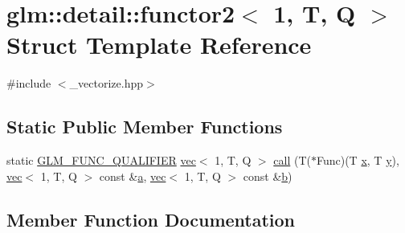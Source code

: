 \hypertarget{structglm_1_1detail_1_1functor2_3_011_00_01_t_00_01_q_01_4}{}\section{glm\+:\+:detail\+:\+:functor2$<$ 1, T, Q $>$ Struct Template Reference}
\label{structglm_1_1detail_1_1functor2_3_011_00_01_t_00_01_q_01_4}


{\ttfamily \#include $<$\+\_\+vectorize.\+hpp$>$}

\subsection*{Static Public Member Functions}
\begin{DoxyCompactItemize}
\item 
static \hyperlink{setup_8hpp_a33fdea6f91c5f834105f7415e2a64407}{G\+L\+M\+\_\+\+F\+U\+N\+C\+\_\+\+Q\+U\+A\+L\+I\+F\+I\+ER} \hyperlink{structglm_1_1vec}{vec}$<$ 1, T, Q $>$ \hyperlink{structglm_1_1detail_1_1functor2_3_011_00_01_t_00_01_q_01_4_a0b888a7ffd7160ff96736ecad347708c}{call} (T($\ast$Func)(T \hyperlink{_s_d_l__opengl_8h_ad0e63d0edcdbd3d79554076bf309fd47}{x}, T \hyperlink{_s_d_l__opengl_8h_a1675d9d7bb68e1657ff028643b4037e3}{y}), \hyperlink{structglm_1_1vec}{vec}$<$ 1, T, Q $>$ const \&\hyperlink{_s_d_l__opengl__glext_8h_a3309789fc188587d666cda5ece79cf82}{a}, \hyperlink{structglm_1_1vec}{vec}$<$ 1, T, Q $>$ const \&\hyperlink{_s_d_l__opengl__glext_8h_a0f71581a41fd2264c8944126dabbd010}{b})
\end{DoxyCompactItemize}


\subsection{Member Function Documentation}
\mbox{\label{structglm_1_1detail_1_1functor2_3_011_00_01_t_00_01_q_01_4_a0b888a7ffd7160ff96736ecad347708c}} 
